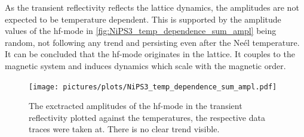 \FloatBarrier
As the transient reflectivity reflects the lattice dynamics, the amplitudes are not expected to be temperature dependent.
This is supported by the amplitude values of the hf-mode in \autoref{fig:NiPS3_temp_dependence_sum_ampl} being random, not following any trend and persisting even after the Neél temperature.
It can be concluded that the hf-mode originates in the lattice.
It couples to the magnetic system and induces dynamics which scale with the magnetic order.
\begin{figure}[hbt!]
    \centering  
    \texttt{[image: pictures/plots/NiPS3\_temp\_dependence\_sum\_ampl.pdf]} \vspace{-0.3cm}
    \caption{The exctracted amplitudes of the hf-mode in the transient reflectivity plotted against the temperatures, the respective data traces were taken at. There is no clear trend visible.}
    \label{fig:NiPS3_temp_dependence_sum_ampl}
\end{figure}
\FloatBarrier


